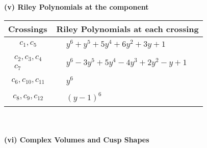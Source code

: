 \documentclass[1p]{elsarticle_modified}
\theoremstyle{definition}
\begin{document}
\newpage\renewcommand{\arraystretch}{1}
\flushleft \textbf{(v) Riley Polynomials at the component}\newline \\
\begin{tabular}{m{50pt}|m{274pt}}
Crossings & \hspace{64pt}Riley Polynomials at each crossing \\
\hline $$\begin{aligned}c_{1},c_{5}\end{aligned}$$&$\begin{aligned}
&y^6+y^5+5 y^4+6 y^2+3 y+1
\end{aligned}$\\
\hline $$\begin{aligned}c_{2},c_{3},c_{4}\\c_{7}\end{aligned}$$&$\begin{aligned}
&y^6-3 y^5+5 y^4-4 y^3+2 y^2- y+1
\end{aligned}$\\
\hline $$\begin{aligned}c_{6},c_{10},c_{11}\end{aligned}$$&$\begin{aligned}
&y^6
\end{aligned}$\\
\hline $$\begin{aligned}c_{8},c_{9},c_{12}\end{aligned}$$&$\begin{aligned}
&(y-1)^6
\end{aligned}$\\
\hline
\end{tabular}\\~\\
\newpage\flushleft \textbf{(vi) Complex Volumes and Cusp Shapes}
\end{document}
